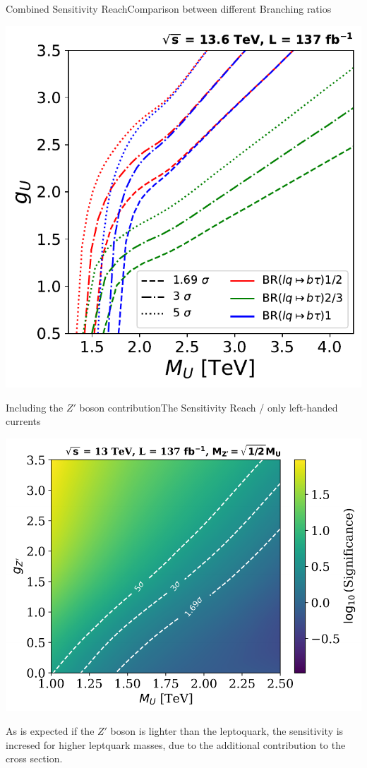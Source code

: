 \documentclass{bredelebeamer}
\begin{document}
\begin{frame}{Combined Sensitivity Reach}{Comparison between different Branching ratios}
	\begin{center}
		\includegraphics[width=.68\linewidth]{Significance_Curves_Summary_by_BR.pdf}
	\end{center}
\end{frame}

\begin{frame}{Including the $Z'$ boson contribution}{The Sensitivity Reach / only left-handed currents}
	\begin{center}
		\includegraphics[width=.68\linewidth]{zp_lower_limit_woRHC_gu1_75.pdf}
	\end{center}
	{\large
		  As is expected if the $Z'$ boson is lighter than the leptoquark, the sensitivity is incresed for higher leptquark masses, due to the additional contribution to the cross section.
	}
\end{frame}
\end{document}
